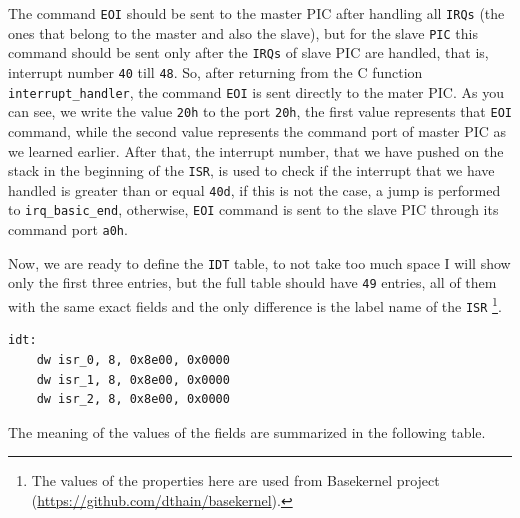 The command \lstinline!EOI! should be sent to the master PIC after
handling all \lstinline!IRQs! (the ones that belong to the master and
also the slave), but for the slave \lstinline!PIC! this command should
be sent only after the \lstinline!IRQs! of slave PIC are handled, that
is, interrupt number \lstinline!40! till \lstinline!48!. So, after
returning from the C function \lstinline!interrupt_handler!, the command
\lstinline!EOI! is sent directly to the mater PIC. As you can see, we
write the value \lstinline!20h! to the port \lstinline!20h!, the first
value represents that \lstinline!EOI! command, while the second value
represents the command port of master PIC as we learned earlier. After
that, the interrupt number, that we have pushed on the stack in the
beginning of the \lstinline!ISR!, is used to check if the interrupt that
we have handled is greater than or equal \lstinline!40d!, if this is not
the case, a jump is performed to \lstinline!irq_basic_end!, otherwise,
\lstinline!EOI! command is sent to the slave PIC through its command
port \lstinline!a0h!.

Now, we are ready to define the \lstinline!IDT! table, to not take too
much space I will show only the first three entries, but the full table
should have \lstinline!49! entries, all of them with the same exact
fields and the only difference is the label name of the \lstinline!ISR!
\footnote{The values of the properties here are used from Basekernel
  project (\url{https://github.com/dthain/basekernel}).}.

\begin{lstlisting}
idt:
    dw isr_0, 8, 0x8e00, 0x0000
    dw isr_1, 8, 0x8e00, 0x0000
    dw isr_2, 8, 0x8e00, 0x0000
\end{lstlisting}

The meaning of the values of the fields are summarized in the following
table.

